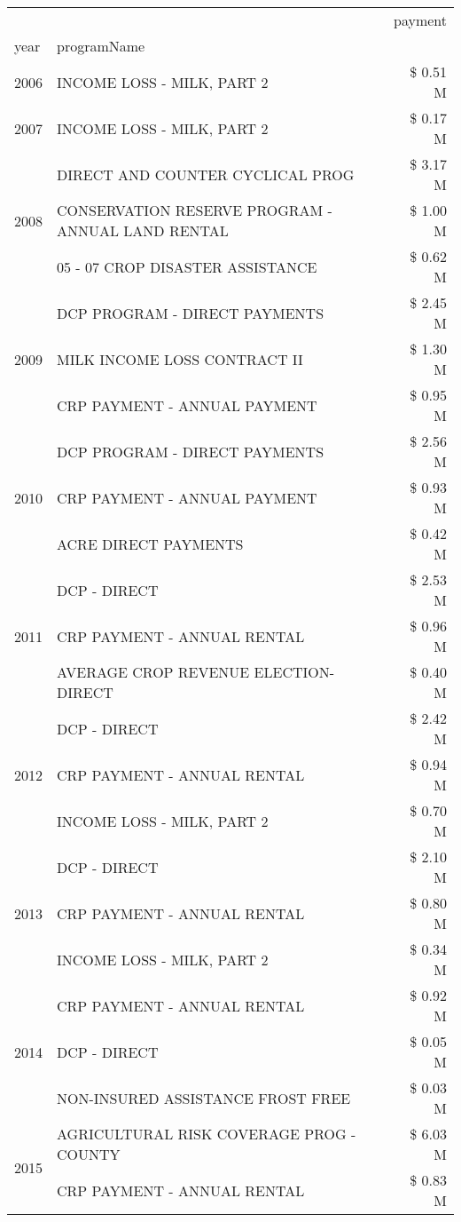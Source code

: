 \begin{tabular}{llr}
\toprule
 &  & payment \\
year & programName &  \\
\midrule
2006 & INCOME LOSS - MILK, PART 2 & \$ 0.51 M \\
\cline{1-3}
2007 & INCOME LOSS - MILK, PART 2 & \$ 0.17 M \\
\cline{1-3}
\multirow[t]{3}{*}{2008} & DIRECT AND COUNTER CYCLICAL PROG & \$ 3.17 M \\
 & CONSERVATION RESERVE PROGRAM - ANNUAL LAND RENTAL & \$ 1.00 M \\
 & 05 - 07 CROP DISASTER ASSISTANCE & \$ 0.62 M \\
\cline{1-3}
\multirow[t]{3}{*}{2009} & DCP PROGRAM - DIRECT PAYMENTS & \$ 2.45 M \\
 & MILK INCOME LOSS CONTRACT II & \$ 1.30 M \\
 & CRP PAYMENT - ANNUAL PAYMENT & \$ 0.95 M \\
\cline{1-3}
\multirow[t]{3}{*}{2010} & DCP PROGRAM - DIRECT PAYMENTS & \$ 2.56 M \\
 & CRP PAYMENT - ANNUAL PAYMENT & \$ 0.93 M \\
 & ACRE DIRECT PAYMENTS & \$ 0.42 M \\
\cline{1-3}
\multirow[t]{3}{*}{2011} & DCP - DIRECT & \$ 2.53 M \\
 & CRP PAYMENT - ANNUAL RENTAL & \$ 0.96 M \\
 & AVERAGE CROP REVENUE ELECTION-DIRECT & \$ 0.40 M \\
\cline{1-3}
\multirow[t]{3}{*}{2012} & DCP - DIRECT & \$ 2.42 M \\
 & CRP PAYMENT - ANNUAL RENTAL & \$ 0.94 M \\
 & INCOME LOSS - MILK, PART 2 & \$ 0.70 M \\
\cline{1-3}
\multirow[t]{3}{*}{2013} & DCP - DIRECT & \$ 2.10 M \\
 & CRP PAYMENT - ANNUAL RENTAL & \$ 0.80 M \\
 & INCOME LOSS - MILK, PART 2 & \$ 0.34 M \\
\cline{1-3}
\multirow[t]{3}{*}{2014} & CRP PAYMENT - ANNUAL RENTAL & \$ 0.92 M \\
 & DCP - DIRECT & \$ 0.05 M \\
 & NON-INSURED ASSISTANCE FROST FREE & \$ 0.03 M \\
\cline{1-3}
\multirow[t]{3}{*}{2015} & AGRICULTURAL RISK COVERAGE PROG - COUNTY & \$ 6.03 M \\
 & CRP PAYMENT - ANNUAL RENTAL & \$ 0.83 M \\

\end{tabular}
